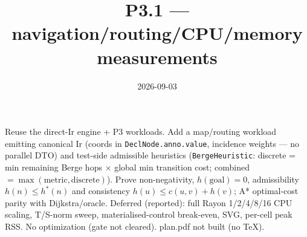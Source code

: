\documentclass[11pt]{article}\usepackage[margin=1in]{geometry}
\title{P3.1 --- navigation/routing/CPU/memory measurements}\date{2026-09-03}
\begin{document}
\maketitle
Reuse the direct-Ir engine + P3 workloads. Add a map/routing workload emitting canonical Ir
(coords in \texttt{DeclNode.anno.value}, incidence weights --- no parallel DTO) and test-side
admissible heuristics (\texttt{BergeHeuristic}: discrete = min remaining Berge hops $\times$
global min transition cost; combined $= \max(\text{metric}, \text{discrete})$). Prove
non-negativity, $h(\text{goal})=0$, admissibility $h(n)\le h^*(n)$ and consistency
$h(u)\le c(u,v)+h(v)$; A* optimal-cost parity with Dijkstra/oracle. Deferred (reported): full
Rayon 1/2/4/8/16 CPU scaling, T/S-norm sweep, materialised-control break-even, SVG, per-cell
peak RSS. No optimization (gate not cleared). plan.pdf not built (no TeX).
\end{document}
